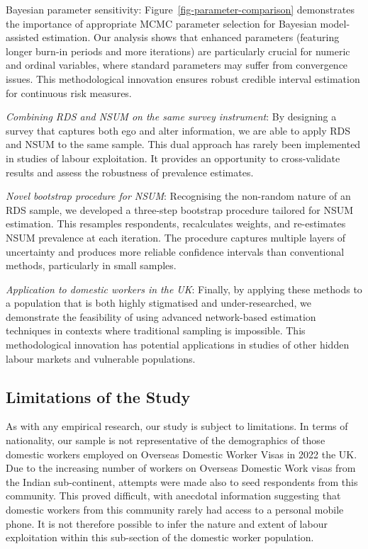 \documentclass[
  12pt,
  letterpaper,
  DIV=11,
  numbers=noendperiod]{scrartcl}
\theoremstyle{plain}
\theoremstyle{definition}
\begin{document}
Bayesian parameter sensitivity: Figure~\ref{fig-parameter-comparison}
demonstrates the importance of appropriate MCMC parameter selection for
Bayesian model-assisted estimation. Our analysis shows that enhanced
parameters (featuring longer burn-in periods and more iterations) are
particularly crucial for numeric and ordinal variables, where standard
parameters may suffer from convergence issues. This methodological
innovation ensures robust credible interval estimation for continuous
risk measures.

\emph{Combining RDS and NSUM on the same survey instrument}: By
designing a survey that captures both ego and alter information, we are
able to apply RDS and NSUM to the same sample. This dual approach has
rarely been implemented in studies of labour exploitation. It provides
an opportunity to cross-validate results and assess the robustness of
prevalence estimates.

\emph{Novel bootstrap procedure for NSUM}: Recognising the non-random
nature of an RDS sample, we developed a three-step bootstrap procedure
tailored for NSUM estimation. This resamples respondents, recalculates
weights, and re-estimates NSUM prevalence at each iteration. The
procedure captures multiple layers of uncertainty and produces more
reliable confidence intervals than conventional methods, particularly in
small samples.

\emph{Application to domestic workers in the UK}: Finally, by applying
these methods to a population that is both highly stigmatised and
under-researched, we demonstrate the feasibility of using advanced
network-based estimation techniques in contexts where traditional
sampling is impossible. This methodological innovation has potential
applications in studies of other hidden labour markets and vulnerable
populations.

\subsection{Limitations of the Study}\label{limitations-of-the-study}

As with any empirical research, our study is subject to limitations. In
terms of nationality, our sample is not representative of the
demographics of those domestic workers employed on Overseas Domestic
Worker Visas in 2022 the UK. Due to the increasing number of workers on
Overseas Domestic Work visas from the Indian sub-continent, attempts
were made also to seed respondents from this community. This proved
difficult, with anecdotal information suggesting that domestic workers
from this community rarely had access to a personal mobile phone. It is
not therefore possible to infer the nature and extent of labour
exploitation within this sub-section of the domestic worker population.
\end{document}
